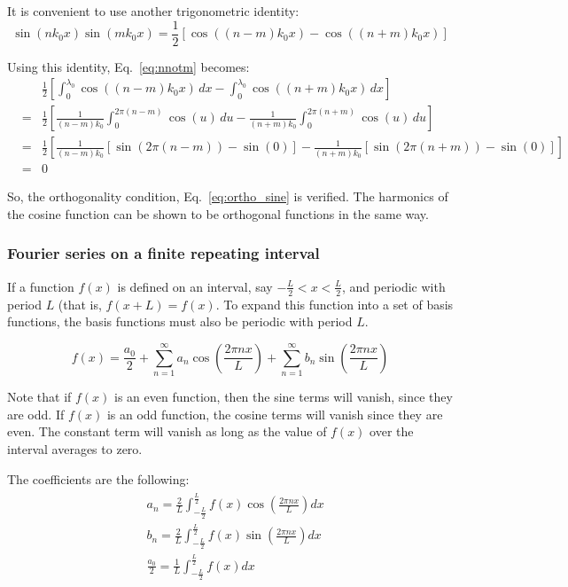 \documentclass[12pt]{article}
\begin{document}
\begin{flushleft}
It is convenient to use another trigonometric identity:
\[
\sin{(nk_{0}x)}\sin{(mk_{0}x)} = \frac{1}{2}\left[ \cos{((n-m)k_{0}x)} - \cos{((n+m)k_{0}x)} \right]
\]

Using this identity, Eq.~\ref{eq:nnotm} becomes:
\begin{eqnarray*}
& & \frac{1}{2}\left[ \int_{0}^{\lambda_{0}} \cos{((n-m)k_{0}x)} \, dx - \int_{0}^{\lambda_{0}} \cos{((n+m)k_{0}x)} \, dx \right] \\
& =& \frac{1}{2}\left[ \frac{1}{(n-m)k_{0}} \int_{0}^{2\pi (n-m)} \cos{(u)} \, du - \frac{1}{(n+m)k_{0}} \int_{0}^{2\pi (n+m)} \cos{(u)} \, du \right] \\
& =& \frac{1}{2}\left[ \frac{1}{(n-m)k_{0}} [ \sin{(2\pi (n-m))} - \sin{(0)} ] - \frac{1}{(n+m)k_{0}} [ \sin{(2\pi (n+m))} -\sin{(0)} ] \right] \\
& = & 0
\end{eqnarray*}

So, the orthogonality condition, Eq.~\ref{eq:ortho_sine} is verified.  The harmonics of the cosine function can be shown to be orthogonal functions in the same way.

\subsubsection*{\bf \color{mygreen} Fourier series on a finite repeating interval}

If a function $f(x)$ is defined on an interval, say $-\frac{L}{2}<x<\frac{L}{2}$, and periodic with period $L$ (that is, $f(x+L)=f(x)$.  To expand this function into a set of basis functions, the basis functions must also be periodic with period $L$.

\begin{equation}
f(x) = \frac{a_{0}}{2} + \sum_{n=1}^{\infty} a_{n}\cos{\left(\frac{2\pi nx}{L}\right)} + \sum_{n=1}^{\infty} b_{n}\sin{\left(\frac{2\pi n x}{L}\right)}
\label{eq:fourier}
\end{equation}

Note that if $f(x)$ is an even function, then the sine terms will vanish, since they are odd.  If $f(x)$ is an odd function, the cosine terms will vanish since they are even.  The constant term will vanish as long as the value of $f(x)$ over the interval averages to zero.

The coefficients are the following:
\begin{eqnarray*}
\begin{aligned}
& a_{n}=\frac{2}{L}\int_{-\frac{L}{2}}^{\frac{L}{2}} f(x) \cos{\left( \frac{2\pi n x}{L} \right)} dx \\
& b_{n}=\frac{2}{L}\int_{-\frac{L}{2}}^{\frac{L}{2}} f(x) \sin{\left( \frac{2\pi n x}{L} \right)} dx \\
& \frac{a_{0}}{2}=\frac{1}{L}\int_{-\frac{L}{2}}^{\frac{L}{2}} f(x) dx \\
\end{aligned}
\end{eqnarray*}


\end{flushleft}
\end{document}
